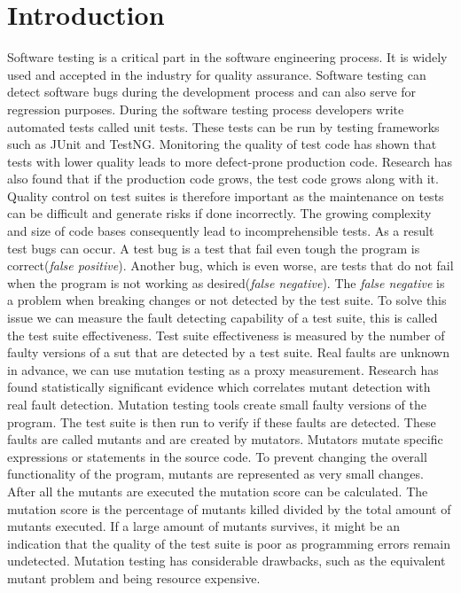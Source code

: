 \documentclass[../main]{subfiles}
\begin{document}
\chapter{Introduction}
\label{ch:introduction}
Software testing is a critical part in the software engineering process. It is widely used and accepted in the industry for quality assurance. 
Software testing can detect software bugs during the development process and can also serve for regression purposes\cite{Bertolino2007SoftwareDreams}. 
During the software testing process developers write automated tests called unit tests. 
These tests can be run by testing frameworks such as JUnit and TestNG\cite{JUnit, TestNG}.
Monitoring the quality of test code has shown that tests with lower quality leads to more defect-prone production code\cite{Spadini2018OnQuality}. 
Research has also found that if the production code grows, the test code grows along with it\cite{Zaidman2008MiningCode}. 
Quality control on test suites is therefore important as the maintenance on tests can be difficult and generate risks if done incorrectly\cite{Horvath2015TestMetrics}.
\newline
The growing complexity and size of code bases consequently lead to incomprehensible tests.
As a result test bugs can occur. 
A test bug is a test that fail even tough the program is correct(\textit{false positive}). 
Another bug, which is even worse, are tests that do not fail when the program is not working as desired(\textit{false negative}).
The \textit{false negative} is a problem when breaking changes or not detected by the test suite.
\newline
To solve this issue we can measure the fault detecting capability of a test suite, this is called the test suite effectiveness.
Test suite effectiveness is measured by the number of faulty versions of a \acrfull{sut} that are detected by a test suite.
Real faults are unknown in advance, we can use mutation testing as a proxy measurement. 
Research has found statistically significant evidence which correlates mutant detection with real fault detection\cite{Just2014AreTesting}.
\newline
Mutation testing tools create small faulty versions of the program.
The test suite is then run to verify if these faults are detected.
These faults are called mutants and are created by mutators.
Mutators mutate specific expressions or statements in the source code. 
To prevent changing the overall functionality of the program, mutants are represented as very small changes\cite{Lipton1978HintsProgrammer}.
\newline
After all the mutants are executed the mutation score can be calculated. 
The mutation score is the percentage of mutants killed divided by the total amount of mutants executed.
If a large amount of mutants survives, it might be an indication that the quality of the test suite is poor as programming errors remain undetected.
Mutation testing has considerable drawbacks, such as the equivalent mutant problem and being resource expensive.
\end{document}
